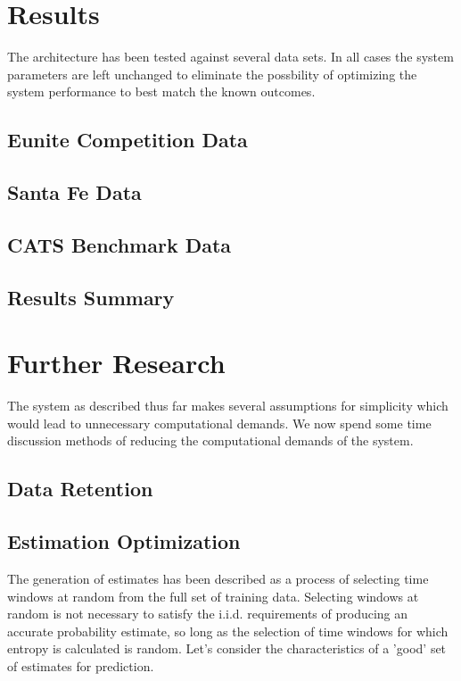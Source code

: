 \documentclass[10pt]{article}
\begin{document}


\section{Results}
The architecture has been tested against several data sets.  In all cases the system parameters are left unchanged to eliminate the possbility of optimizing the system performance to best match the known outcomes.

\subsection{Eunite Competition Data}


\subsection{Santa Fe Data}


\subsection{CATS Benchmark Data}


\subsection{Results Summary}


\section{Further Research}
The system as described thus far makes several assumptions for simplicity which would lead to unnecessary computational demands.  We now spend some time discussion methods of reducing the computational demands of the system.  

\subsection{Data Retention}

\subsection{Estimation Optimization}
The generation of estimates has been described as a process of selecting time windows at random from the full set of training data.  Selecting windows at random is not necessary to satisfy the i.i.d. requirements of producing an accurate probability estimate, so long as the selection of time windows for which entropy is calculated is random.  Let's consider the characteristics of a 'good' set of estimates for prediction.  
\end{document}
